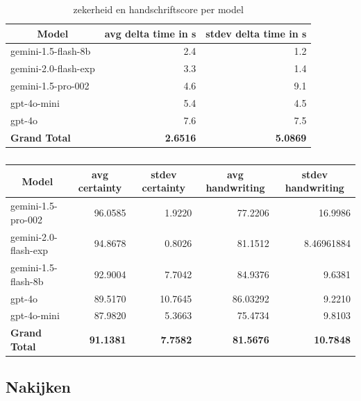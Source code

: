 \documentclass[12pt]{article}
\begin{document}
\noindent\begin{table}[H]
\caption{zekerheid en handschriftscore per model} 
\label{fig:time-model} 
\begin{tabularx}{\textwidth}{X *2{r}}
    \toprule
    \multicolumn{1}{c}{\textbf{Model}} & \multicolumn{1}{c}{\textbf{avg delta time in s}} & \multicolumn{1}{c}{\textbf{stdev delta time in s}} \\
    \midrule
    gemini-1.5-flash-8b & 2.4 & 1.2 \\
    gemini-2.0-flash-exp & 3.3 & 1.4 \\
    gemini-1.5-pro-002 & 4.6 & 9.1 \\
    gpt-4o-mini & 5.4 & 4.5 \\
    gpt-4o & 7.6 & 7.5 \\
    \midrule
    \textbf{Grand Total} & \textbf{2.6516} & \textbf{5.0869} \\
    \bottomrule
\end{tabularx}%
\end{table}

\noindent\begin{table}[H]
\caption{}
\label{fig:certainty-model}
\begin{tabularx}{\textwidth}{X *4{r}}
    \toprule
    \multicolumn{1}{c}{\textbf{Model}} & \multicolumn{1}{c}{\textbf{avg  certainty}} & \multicolumn{1}{c}{\textbf{stdev certainty}} & \multicolumn{1}{c}{\textbf{avg handwriting}} & \multicolumn{1}{c}{\textbf{stdev handwriting}} \\
    \midrule
    gemini-1.5-pro-002 & 96.0585 & 1.9220 & 77.2206 & 16.9986 \\
    gemini-2.0-flash-exp & 94.8678 & 0.8026 & 81.1512 & 8.46961884 \\
    gemini-1.5-flash-8b & 92.9004 & 7.7042 & 84.9376 & 9.6381 \\
    gpt-4o & 89.5170 & 10.7645 & 86.03292 & 9.2210 \\
    gpt-4o-mini & 87.9820 & 5.3663 & 75.4734 & 9.8103 \\
    \midrule
    \textbf{Grand Total} & \textbf{91.1381} & \textbf{7.7582} & \textbf{81.5676} & \textbf{10.7848} \\
    \bottomrule
\end{tabularx}%
\end{table}

\pagebreak
\subsection{Nakijken}
\end{document}
